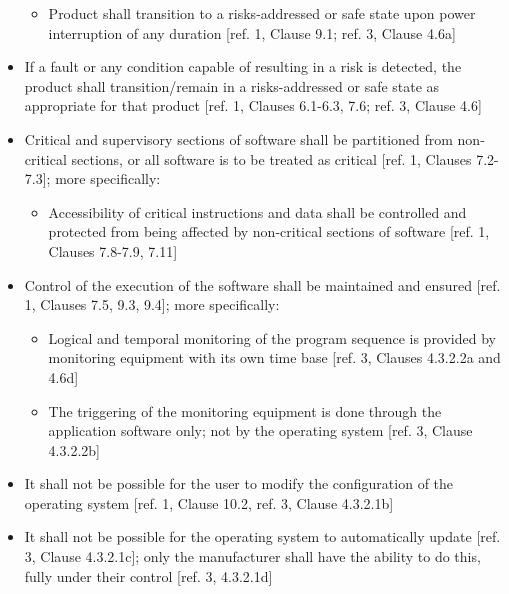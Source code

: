 \documentclass[12pt]{../Common_files/ElisaPaper}
\begin{document}
\begin{itemize}
\begin{itemize}
\item Product shall transition to a risks-addressed or safe state upon power interruption of any duration [ref. 1,  Clause 9.1; ref. 3, Clause 4.6a]

\end{itemize}

\item If a fault or any condition capable of resulting in a risk is detected, the product shall transition/remain in a risks-addressed or safe state as appropriate for that product [ref. 1, Clauses 6.1-6.3, 7.6; ref. 3, Clause 4.6]

\item Critical and supervisory sections of software shall be partitioned from non-critical sections, or all software is to be treated as critical [ref. 1, Clauses 7.2-7.3]; more specifically:

\begin{itemize}

\item Accessibility of critical instructions and data shall be controlled and protected from being affected by non-critical sections of software [ref. 1, Clauses 7.8-7.9, 7.11]

\end{itemize}

\item Control of the execution of the software shall be maintained and ensured [ref. 1, Clauses 7.5, 9.3, 9.4]; more specifically:

\begin{itemize}

\item Logical and temporal monitoring of the program sequence is provided by monitoring equipment with its own time base [ref. 3, Clauses 4.3.2.2a and 4.6d]

\item The triggering of the monitoring equipment is done through the application software only; not by the operating system [ref. 3, Clause 4.3.2.2b]

\end{itemize}

\item It shall not be possible for the user to modify the configuration of the operating system [ref. 1, Clause 10.2, ref. 3, Clause 4.3.2.1b]

\item It shall not be possible for the operating system to automatically update [ref. 3, Clause 4.3.2.1c]; only the manufacturer shall have the ability to do this, fully under their control  [ref. 3, 4.3.2.1d]


\end{itemize}
\end{document}
